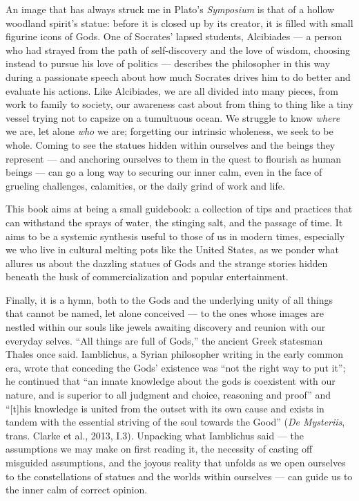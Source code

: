 \documentclass[
]{book}
\begin{document}
An image that has always struck me in Plato's \emph{Symposium} is that of a hollow woodland spirit's statue: before it is closed up by its creator, it is filled with small figurine icons of Gods. One of Socrates' lapsed students, Alcibiades --- a person who had strayed from the path of self-discovery and the love of wisdom, choosing instead to pursue his love of politics --- describes the philosopher in this way during a passionate speech about how much Socrates drives him to do better and evaluate his actions. Like Alcibiades, we are all divided into many pieces, from work to family to society, our awareness cast about from thing to thing like a tiny vessel trying not to capsize on a tumultuous ocean. We struggle to know \emph{where} we are, let alone \emph{who} we are; forgetting our intrinsic wholeness, we seek to be whole. Coming to see the statues hidden within ourselves and the beings they represent --- and anchoring ourselves to them in the quest to flourish as human beings --- can go a long way to securing our inner calm, even in the face of grueling challenges, calamities, or the daily grind of work and life.

This book aims at being a small guidebook: a collection of tips and practices that can withstand the sprays of water, the stinging salt, and the passage of time. It aims to be a systemic synthesis useful to those of us in modern times, especially we who live in cultural melting pots like the United States, as we ponder what allures us about the dazzling statues of Gods and the strange stories hidden beneath the husk of commercialization and popular entertainment.

Finally, it is a hymn, both to the Gods and the underlying unity of all things that cannot be named, let alone conceived --- to the ones whose images are nestled within our souls like jewels awaiting discovery and reunion with our everyday selves. ``All things are full of Gods,'' the ancient Greek statesman Thales once said. Iamblichus, a Syrian philosopher writing in the early common era, wrote that conceding the Gods' existence was ``not the right way to put it''; he continued that ``an innate knowledge about the gods is coexistent with our nature, and is superior to all judgment and choice, reasoning and proof'' and ``{[}t{]}his knowledge is united from the outset with its own cause and exists in tandem with the essential striving of the soul towards the Good'' (\emph{De Mysteriis}, trans. Clarke et al., 2013, I.3). Unpacking what Iamblichus said --- the assumptions we may make on first reading it, the necessity of casting off misguided assumptions, and the joyous reality that unfolds as we open ourselves to the constellations of statues and the worlds within ourselves --- can guide us to the inner calm of correct opinion.
\end{document}
